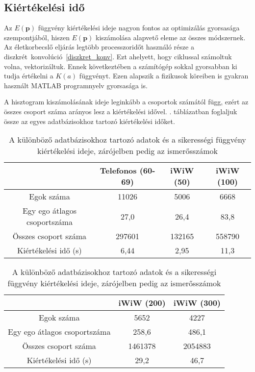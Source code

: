 \documentclass[12pt]{article}
\begin{document}
\subsection{Kiértékelési idő} \label{kiertekelesi_ido}
Az $E(\mathbf{p})$ függvény kiértékelési ideje nagyon fontos az optimizálás gyorsasága szempontjából, hiszen $E(\mathbf{p})$ kiszámolása alapvető eleme az összes módszernek. Az életkorbecslő eljárás legtöbb processzoridőt használó része a \mbox{diszkrét konvolúció \eqref{diszkret_konv}}. Ezt ahelyett, hogy ciklussal számoltuk volna, vektorizáltuk. Ennek következtében a számítógép sokkal gyorsabban ki tudja értékelni a $K(a)$ függvényt. Ezen alapszik a fizikusok köreiben is gyakran használt MATLAB programnyelv gyorsasága is. %

A hisztogram kiszámolásának ideje leginkább a csoportok számától függ, ezért az összes csoport száma arányos lesz a kiértékelési idővel.
. táblázatban foglaljuk össze az egyes adatbázisokhoz tartozó kiértékelési időket.
\begin{table}[H]
	\centering
	\begin{subtable}{1.0\textwidth}
		\centering
		\begin{tabular}{|c|c|c|c|}
			\hline
			& Telefonos (60-69) & iWiW (50) & iWiW (100)  \\
			\hline
			Egok száma & 11026 & 5006 & 6668 \\
			\hline
			Egy ego átlagos csoportszáma & 27,0 & 26,4 & 83,8 \\
			\hline
			Összes csoport száma & 297601 & 132165 & 558790 \\
			\hline
			Kiértékelési idő (s) & 6,44 & 2,95 & 11,3\\
			\hline
		\end{tabular}
		\caption{}
		\label{}
	\end{subtable}
	\newline
	\vspace*{0.5cm} %
	\newline
	\begin{subtable}{1.0\textwidth}
		\centering
		\begin{tabular}{|c|c|c|}
			\hline
			& iWiW (200) & iWiW (300)  \\
			\hline
			Egok száma & 5652 & 4227 \\
			\hline
			Egy ego átlagos csoportszáma & 258,6 & 486,1 \\
			\hline
			Összes csoport száma & 1461378 & 2054883 \\
			\hline
			Kiértékelési idő (s) & 29,2 & 46,7 \\
			\hline
		\end{tabular}
		\caption{}
		\label{}
	\end{subtable}
	\caption{A különböző adatbázisokhoz tartozó adatok és a sikerességi függvény kiértékelési ideje, zárójelben pedig az ismerősszámok}
	\label{csoport_kiertekeles}
\end{table}
\end{document}
